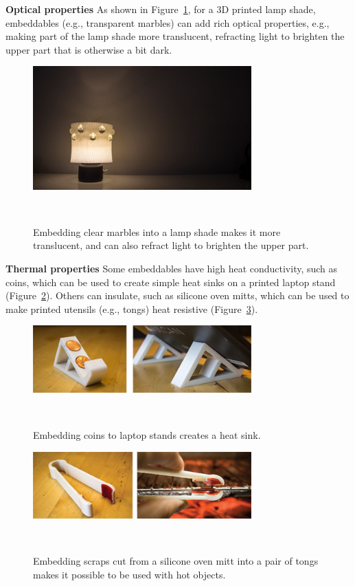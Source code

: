\textbf{Optical properties} As shown in Figure~\ref{fig:lamp_shade}, for a 3D printed lamp shade, embeddables (e.g., transparent marbles) can add rich optical properties, e.g., making part of the lamp shade more translucent, refracting light to brighten the upper part that is otherwise a bit dark. 

\begin{figure} [h!]
  \centering
  \includegraphics[width=0.75\textwidth]{figures/lamp_shade2}
  \caption{Embedding clear marbles into a lamp shade makes it more translucent, and can also refract light to brighten the upper part.}~\label{fig:lamp_shade}
\end{figure}

\textbf{Thermal properties} Some embeddables have high heat conductivity, such as coins, which can be used to create simple heat sinks on a printed laptop stand (Figure~\ref{fig:laptop_stand}). Others can insulate, such as silicone oven mitts, which can be used to make printed utensils (e.g., tongs) heat resistive (Figure~\ref{fig:tongs}).

\begin{figure} [h!]
  \centering
  \includegraphics[width=0.75\textwidth]{figures/laptop_stand}
  \caption{Embedding coins to laptop stands creates a heat sink.}~\label{fig:laptop_stand}
\end{figure}

\begin{figure} [h!]
  \centering
  \includegraphics[width=0.75\textwidth]{figures/tongs}
  \caption{Embedding scraps cut from a silicone oven mitt into a pair of tongs makes it possible to be used with hot objects.}~\label{fig:tongs}
\end{figure}

